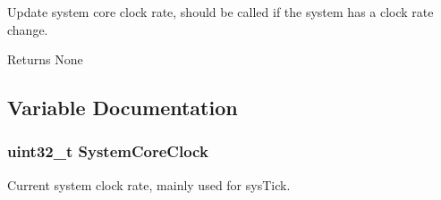 Update system core clock rate, should be called if the system has a clock rate change. 

\begin{DoxyReturn}{Returns}
None 
\end{DoxyReturn}


\subsection{Variable Documentation}
\hypertarget{group__SUPPORT__17XX__40XX__FUNC_gaa3cd3e43291e81e795d642b79b6088e6}{
\subsubsection[{System\-Core\-Clock}]{\setlength{\rightskip}{0pt plus 5cm}uint32\-\_\-t System\-Core\-Clock}}\label{group__SUPPORT__17XX__40XX__FUNC_gaa3cd3e43291e81e795d642b79b6088e6}


Current system clock rate, mainly used for sys\-Tick. 


